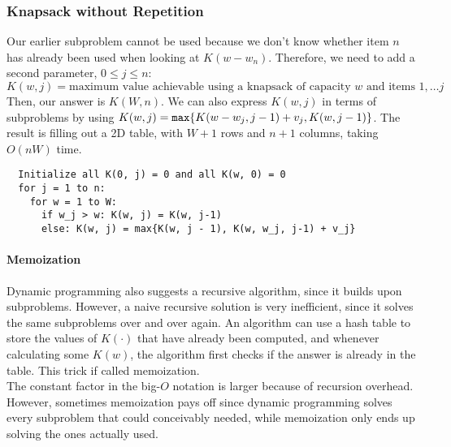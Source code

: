 \subsubsection{Knapsack without Repetition}
Our earlier subproblem cannot be used because we don't know whether item $n$ has already been used when looking at $K(w - w_n)$.
Therefore, we need to add a second parameter, $0 \leq j \leq n$: $$K(w, j) = \text{maximum value achievable using a knapsack of capacity $w$ and items $1,\ldots j$}$$
Then, our answer is $K(W, n)$.
We can also express $K(w, j)$ in terms of subproblems by using $K(w, j) = \verb|max|\{K(w - w_j, j-1) + v_j, K(w, j-1)\}$.
The result is filling out a 2D table, with $W+1$ rows and $n+1$ columns, taking $O(nW)$ time.
\begin{verbatim}
  Initialize all K(0, j) = 0 and all K(w, 0) = 0
  for j = 1 to n:
    for w = 1 to W:
      if w_j > w: K(w, j) = K(w, j-1)
      else: K(w, j) = max{K(w, j - 1), K(w, w_j, j-1) + v_j}
\end{verbatim}

\paragraph{Memoization}
Dynamic programming also suggests a recursive algorithm, since it builds upon subproblems.
However, a naive recursive solution is very inefficient, since it solves the same subproblems over and over again.
An algorithm can use a hash table to store the values of $K(\cdot)$ that have already been computed, and whenever calculating some $K(w)$, the algorithm first checks if the answer is already in the table.
This trick if called memoization.\\
The constant factor in the big-$O$ notation is larger because of recursion overhead.
However, sometimes memoization pays off since dynamic programming solves every subproblem that could conceivably needed, while memoization only ends up solving the ones actually used.

